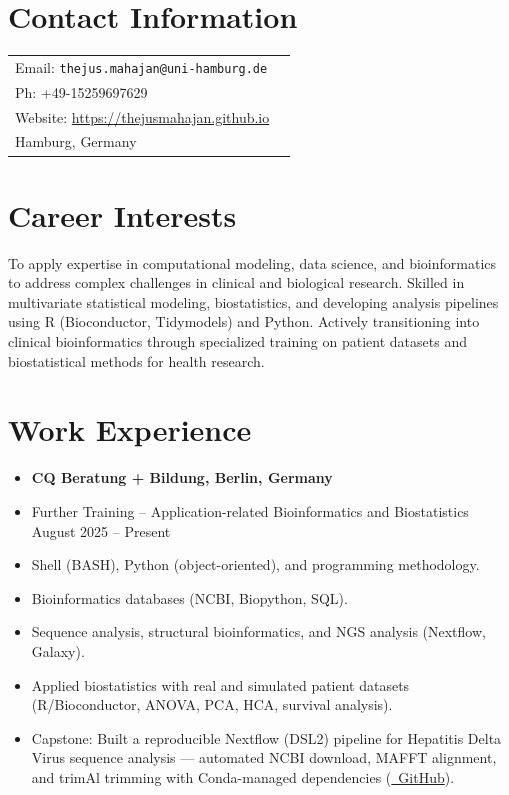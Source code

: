 \documentclass[margin,line,pifont,palatino,courier]{res}
\begin{document}

\begin{resume}

\section{\sc Contact Information}

\vspace{.05in}
\begin{tabular}{@{}p{3.75in}p{2in}}
 Email: \verb+thejus.mahajan@uni-hamburg.de+\\
 Ph: +49-15259697629 \\
 Website: \url{https://thejusmahajan.github.io} \\
 Hamburg, Germany
\end{tabular}

\section{\sc Career Interests}
To apply expertise in computational modeling, data science, and bioinformatics to address complex challenges in clinical and biological research. Skilled in multivariate statistical modeling, biostatistics, and developing analysis pipelines using R (Bioconductor, Tidymodels) and Python. Actively transitioning into clinical bioinformatics through specialized training on patient datasets and biostatistical methods for health research.

\section{\sc Work Experience}

\begin{itemize}
\item {\bf CQ Beratung + Bildung, Berlin, Germany}\\
\vspace*{-.2in}
\item[] Further Training -- Application-related Bioinformatics and Biostatistics\\
August 2025 -- Present
\vspace*{.1in}
\item[-] Shell (BASH), Python (object-oriented), and programming methodology.
\item[-] Bioinformatics databases (NCBI, Biopython, SQL).
\item[-] Sequence analysis, structural bioinformatics, and NGS analysis (Nextflow, Galaxy).
\item[-] Applied biostatistics with real and simulated patient datasets (R/Bioconductor, ANOVA, PCA, HCA, survival analysis).
\item[-] Capstone: Built a reproducible Nextflow (DSL2) pipeline for Hepatitis Delta Virus sequence analysis --- automated NCBI download, MAFFT alignment, and trimAl trimming with Conda-managed dependencies (\href{https://github.com/thejusmahajan/hepatitis-delta-pipeline}{\faGithub\ GitHub}).
\end{itemize}
\vspace*{.1in}


\end{resume}
\end{document}
